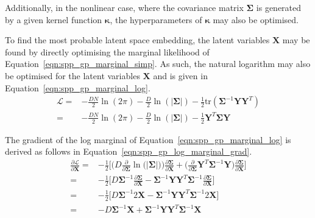 Additionally, in the nonlinear case, where the covariance matrix \( \bm{\Sigma} \) is generated by 
a given kernel function \( \bm{\kappa} \), the hyperparameters of \( \bm{\kappa} \) may also be 
optimised.

To find the most probable latent space embedding, the latent variables \( \bm{X} \) may be 
found by directly optimising the marginal likelihood of Equation~\ref{eqn:spp_gp_marginal_simp}. 
As such, the natural logarithm may also be optimised for the latent variables \( \bm{X} \) and 
is given in Equation~\ref{eqn:spp_gp_marginal_log}.
\begin{align}
  \label{eqn:spp_gp_marginal_log}
  \mathcal{L} ={}& -\frac{DN}{2} \ln(2\pi)
  -\frac{D}{2} \ln(\left| \bm{\Sigma} \right|)
  -\frac{1}{2} \text{tr}(\bm{\Sigma}^{-1} \bm{YY}^{T})\\
  ={}& -\frac{DN}{2} \ln(2\pi)
  -\frac{D}{2} \ln(\left| \bm{\Sigma} \right|)
  -\frac{1}{2} \bm{Y}^{T}\bm{\Sigma}\bm{Y}
\end{align}

The gradient of the log marginal of Equation~\ref{eqn:spp_gp_marginal_log} 
is derived as follows in Equation~\ref{eqn:spp_gp_log_marginal_grad}.
\begin{align}
  \label{eqn:spp_gp_log_marginal_grad}
  \frac{\partial \mathcal{L}}{\partial \bm{X}} ={}&
  -\frac{1}{2} \Bigg[
    \Big( D \frac{\partial}{\partial \bm{\Sigma}} 
    \ln \big( \left| \bm{\Sigma} \right| \big) \Big) 
    \frac{\partial \bm{\Sigma}}{\partial \bm{X}}
    + \Big( \frac{\partial}{\partial \bm{\Sigma}}
    \bm{Y}^{T} \bm{\Sigma}^{-1} \bm{Y} \Big)
    \frac{\partial \bm{\Sigma}}{\partial \bm{X}}
  \Bigg]\\
  ={}& -\frac{1}{2} \Bigg[
    D \bm{\Sigma}^{-1} \frac{\partial \bm{\Sigma}}{\partial \bm{X}}
    - \bm{\Sigma}^{-1} \bm{YY}^{T} \bm{\Sigma}^{-1} 
    \frac{\partial \bm{\Sigma}}{\partial \bm{X}}
  \Bigg]\\
  ={}& -\frac{1}{2} \Bigg[
    D \bm{\Sigma}^{-1} 2 \bm{X}
    - \bm{\Sigma}^{-1} \bm{YY}^{T} \bm{\Sigma}^{-1} 2 \bm{X}
  \Bigg]\\
  ={}& -D \bm{\Sigma}^{-1} \bm{X}
  + \bm{\Sigma}^{-1} \bm{YY}^{T} \bm{\Sigma}^{-1} \bm{X}
\end{align}

